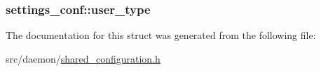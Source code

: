 \subsubsection[{\texorpdfstring{user\+\_\+type}{user_type}}]{ settings\+\_\+conf\+::user\+\_\+type}\hypertarget{structsettings__conf_ad39ce3075370b3bd832e5479ac1c272b}{}\label{structsettings__conf_ad39ce3075370b3bd832e5479ac1c272b}


The documentation for this struct was generated from the following file\+:\begin{DoxyCompactItemize}
\item 
src/daemon/\hyperlink{shared__configuration_8h}{shared\+\_\+configuration.\+h}\end{DoxyCompactItemize}
